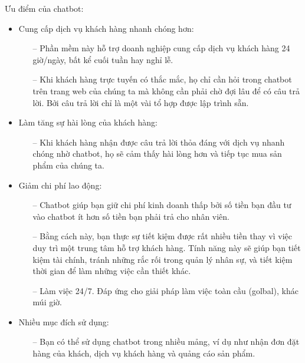 Ưu điểm của chatbot:
\begin{itemize}
    \item Cung cấp dịch vụ khách hàng nhanh chóng hơn:
          \begin{itemize}
              \item[--] Phần mềm này hỗ trợ doanh nghiệp cung cấp dịch vụ khách hàng 24 giờ/ngày, bất kể cuối tuần hay nghỉ lễ.
              \item[--] Khi khách hàng trực tuyến có thắc mắc, họ chỉ cần hỏi trong chatbot trên trang web của chúng ta mà không cần phải chờ đợi lâu để có câu trả lời. Bởi câu trả lời chỉ là một vài tổ hợp được lập trình sẵn.
          \end{itemize}
    \item Làm tăng sự hài lòng của khách hàng:
          \begin{itemize}
              \item[--] Khi khách hàng nhận được câu trả lời thỏa đáng với dịch vụ nhanh chóng nhờ chatbot, họ sẽ cảm thấy hài lòng hơn và tiếp tục mua sản phẩm của chúng ta.
          \end{itemize}
    \item Giảm chi phí lao động:
          \begin{itemize}
              \item[--] Chatbot giúp bạn giữ chi phí kinh doanh thấp bởi số tiền bạn đầu tư vào chatbot ít hơn số tiền bạn phải trả cho nhân viên.
              \item[--] Bằng cách này, bạn thực sự tiết kiệm được rất nhiều tiền thay vì việc duy trì một trung tâm hỗ trợ khách hàng. Tính năng này sẽ giúp bạn tiết kiệm tài chính, tránh những rắc rối trong quản lý nhân sự, và tiết kiệm thời gian để làm những việc cần thiết khác.
              \item[--] Làm việc 24/7. Đáp ứng cho giải pháp làm việc toàn cầu (golbal), khác múi giờ. 
          \end{itemize}
    \item Nhiều mục đích sử dụng:
          \begin{itemize}
              \item[--] Bạn có thể sử dụng chatbot trong nhiều mảng, ví dụ như nhận đơn đặt hàng của khách, dịch vụ khách hàng và quảng cáo sản phẩm.
          \end{itemize}
\end{itemize}

